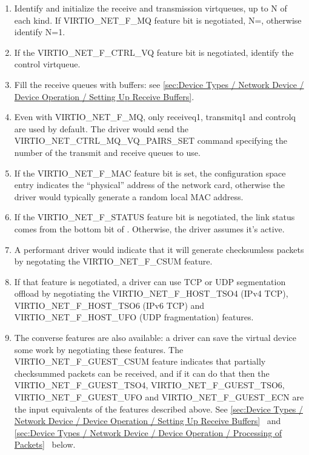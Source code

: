 \begin{enumerate}
\item Identify and initialize the receive and
  transmission virtqueues, up to N of each kind. If
  VIRTIO_NET_F_MQ feature bit is negotiated,
  N=, otherwise identify N=1.

\item If the VIRTIO_NET_F_CTRL_VQ feature bit is negotiated,
  identify the control virtqueue.

\item Fill the receive queues with buffers: see \ref{sec:Device Types / Network Device / Device Operation / Setting Up Receive Buffers}.

\item Even with VIRTIO_NET_F_MQ, only receiveq1, transmitq1 and
  controlq are used by default.  The driver would send the
  VIRTIO_NET_CTRL_MQ_VQ_PAIRS_SET command specifying the
  number of the transmit and receive queues to use.

\item If the VIRTIO_NET_F_MAC feature bit is set, the configuration
  space  entry indicates the ``physical'' address of the
  network card, otherwise the driver would typically generate a random
  local MAC address.

\item If the VIRTIO_NET_F_STATUS feature bit is negotiated, the link
  status comes from the bottom bit of .
  Otherwise, the driver assumes it's active.

\item A performant driver would indicate that it will generate checksumless
  packets by negotating the VIRTIO_NET_F_CSUM feature.

\item If that feature is negotiated, a driver can use TCP or UDP
  segmentation offload by negotiating the VIRTIO_NET_F_HOST_TSO4 (IPv4
  TCP), VIRTIO_NET_F_HOST_TSO6 (IPv6 TCP) and VIRTIO_NET_F_HOST_UFO
  (UDP fragmentation) features.

\item The converse features are also available: a driver can save
  the virtual device some work by negotiating these features.
   The VIRTIO_NET_F_GUEST_CSUM feature indicates that partially
  checksummed packets can be received, and if it can do that then
  the VIRTIO_NET_F_GUEST_TSO4, VIRTIO_NET_F_GUEST_TSO6,
  VIRTIO_NET_F_GUEST_UFO and VIRTIO_NET_F_GUEST_ECN are the input
  equivalents of the features described above.
  See \ref{sec:Device Types / Network Device / Device Operation / Setting Up Receive Buffers}~ and \ref{sec:Device Types / Network Device / Device Operation / Processing of Packets}~ below.
\end{enumerate}

